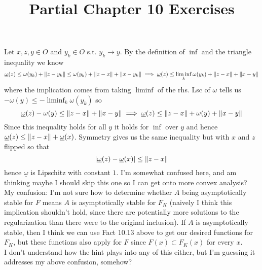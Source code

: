 \documentclass{article}
\title{Partial Chapter 10 Exercises}
\newenvironment{ex}[1]
  {\renewcommand\theexercise{#1}\exercise}
  {\endexercise}
\begin{document}
\begin{ex}{10.8} %
  \newcommand{\uw}{\underline{\omega}}
  \newcommand{\w}{\omega}
  Let $x, z, y \in O$ and $y_k \in O$ s.t. $y_k \to y$.
  By the definition of $\inf$ and the triangle inequality we know
  $$
  \uw(z) \le \w(y_k) + \norm{z - y_k} \le \w(y_k) + \norm{z - x} + \norm{x - y_k} \implies \uw(z) \le \liminf_k \w(y_k) + \norm{z - x} + \norm{x - y}
  $$
  where the implication comes from taking $\liminf$ of the rhs. Lsc of $\w$ tells us $-\w(y) \le -\liminf_k \w(y_k)$ so
  $$
  \uw(z) - \w(y) \le \norm{z - x} + \norm{x - y} \implies \uw(z) \le \norm{z - x} + \w(y) + \norm{x - y}
  $$
  Since this inequality holds for all $y$ it holds for $\inf$ over $y$ and hence $\uw(z) \le \norm{z - x} + \uw(x)$. Symmetry gives us the same inequality but with $x$ and $z$ flipped so that
  $$
  \abs{\uw(z) - \uw(x)} \le \norm{z - x}
  $$
  hence $\uw$ is Lipschitz with constant $1$.
\end{ex} %
\begin{ex}{10.14} %
  I'm somewhat confused here, and am thinking maybe I should skip this one so I can get onto more convex analysis? \, \\

  My confusion: I'm not sure how to determine whether $A$ being asymptotically stable for $F$ means $A$ is asymptotically stable for $F_K$ (naively I think this implication shouldn't hold, since there are potentially more solutions to the regularization than there were to the original inclusion). If $A$ is asymptotically stable, then I think we can use Fact 10.13 above to get our desired functions for $F_K$, but these functions also apply for $F$ since $F(x) \subset F_K(x)$ for every $x$. \, \\

  I don't understand how the hint plays into any of this either, but I'm guessing it addresses my above confusion, somehow?
\end{ex} %
\end{document}
